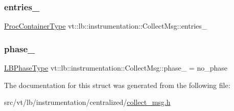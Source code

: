 \subsubsection{\texorpdfstring{entries\+\_\+}{entries\_}}
{\footnotesize\ttfamily \hyperlink{namespacevt_1_1lb_af7c6ee21a7b3966b7ab64c5b626d30f8}{Proc\+Container\+Type} vt\+::lb\+::instrumentation\+::\+Collect\+Msg\+::entries\+\_\+}

\mbox{\label{structvt_1_1lb_1_1instrumentation_1_1_collect_msg_abb032f5e30ac3cb1c9973b360ec75634}} 
\subsubsection{\texorpdfstring{phase\+\_\+}{phase\_}}
{\footnotesize\ttfamily \hyperlink{namespacevt_a5505d0bab25ce2ff566a8e015871b379}{L\+B\+Phase\+Type} vt\+::lb\+::instrumentation\+::\+Collect\+Msg\+::phase\+\_\+ = no\+\_\+phase}



The documentation for this struct was generated from the following file\+:\begin{DoxyCompactItemize}
\item 
src/vt/lb/instrumentation/centralized/\hyperlink{collect__msg_8h}{collect\+\_\+msg.\+h}\end{DoxyCompactItemize}
